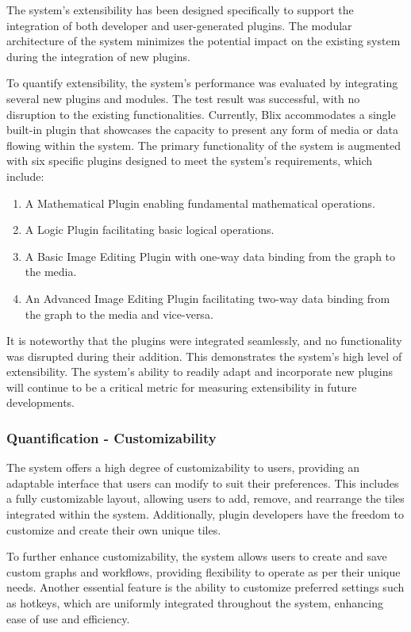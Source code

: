 \documentclass[11pt,a4paper]{article}
\begin{document}
The system's extensibility has been designed specifically to support the
integration of both developer and user-generated plugins. The modular
architecture of the system minimizes the potential impact on the existing system
during the integration of new plugins.

To quantify extensibility, the system's performance was evaluated by integrating
several new plugins and modules. The test result was successful, with no
disruption to the existing functionalities. Currently, Blix accommodates a
single built-in plugin that showcases the capacity to present any form of media
or data flowing within the system. The primary functionality of the system is
augmented with six specific plugins designed to meet the system's requirements,
which include:

\begin{enumerate}
  \item A Mathematical Plugin enabling fundamental mathematical operations. 
  \item A Logic Plugin facilitating basic logical operations.
  \item A Basic Image Editing Plugin with one-way data binding from the graph to
  the media.
  \item An Advanced Image Editing Plugin facilitating two-way data binding from
  the graph to the media and vice-versa.
\end{enumerate}

It is noteworthy that the plugins were integrated seamlessly, and no
functionality was disrupted during their addition. This demonstrates the
system's high level of extensibility. The system's ability to readily adapt and
incorporate new plugins will continue to be a critical metric for measuring
extensibility in future developments.

\subsubsection*{Quantification - Customizability}

The system offers a high degree of customizability to users, providing an
adaptable interface that users can modify to suit their preferences. This
includes a fully customizable layout, allowing users to add, remove, and
rearrange the tiles integrated within the system. Additionally, plugin
developers have the freedom to customize and create their own unique tiles.

To further enhance customizability, the system allows users to create and save
custom graphs and workflows, providing flexibility to operate as per their
unique needs. Another essential feature is the ability to customize preferred
settings such as hotkeys, which are uniformly integrated throughout the system,
enhancing ease of use and efficiency.
\end{document}
